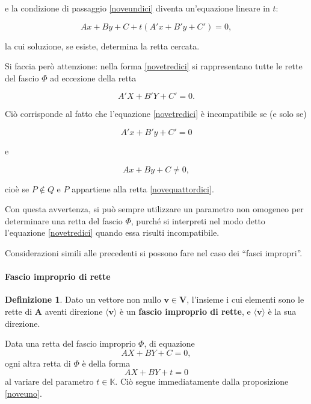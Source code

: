 \documentclass{article}
\theoremstyle{plain}
\theoremstyle{definition}
\newtheorem{defn}{Definizione}[section]
\theoremstyle{remark}
\begin{document}
e la condizione di passaggio \ref{noveundici} diventa un'equazione lineare in $t$:

\begin{equation}\label{novetredici}
Ax + By + C + t(A'x + B'y + C') = 0,
\end{equation}

la cui soluzione, se esiste, determina la retta cercata.

Si faccia però attenzione: nella forma \ref{novetredici} si rappresentano tutte le rette del fascio $\Phi$ ad eccezione della retta

\begin{equation}\label{novequattordici}
A'X + B'Y + C' = 0.
\end{equation}

Ciò corrisponde al fatto che l'equazione \ref{novetredici} è incompatibile se (e solo se)

\[
A'x + B'y + C' = 0
\]

e

\[
Ax + By + C \neq 0,
\]

cioè se $P \notin Q$ e $P$ appartiene alla retta \ref{novequattordici}.

Con questa avvertenza, si può sempre utilizzare un parametro non omogeneo per determinare una retta del fascio $\Phi$, purché si interpreti nel modo detto l'equazione \ref{novetredici} quando essa risulti incompatibile.

Considerazioni simili alle precedenti si possono fare nel caso dei “fasci impropri”. 

\paragraph{Fascio improprio di rette}
\begin{bxthm}
\begin{defn}
Dato un vettore non nullo $\mathbf{v} \in \mathbf{V}$, l'insieme i cui elementi sono le rette di $\mathbf{A}$ aventi direzione $\langle \mathbf{v} \rangle$ è un \textbf{fascio improprio di rette}, e $\langle \mathbf{v} \rangle$ è la sua direzione.
\end{defn}    
\end{bxthm}

\vspace{10pt}

Data una retta del fascio improprio $\Phi$, di equazione
\[
AX + BY + C = 0,
\]
ogni altra retta di $\Phi$ è della forma
\[
AX + BY + t = 0
\]
al variare del parametro $t \in \mathbb{K}$. Ciò segue immediatamente dalla proposizione \ref{noveuno}.
\end{document}
